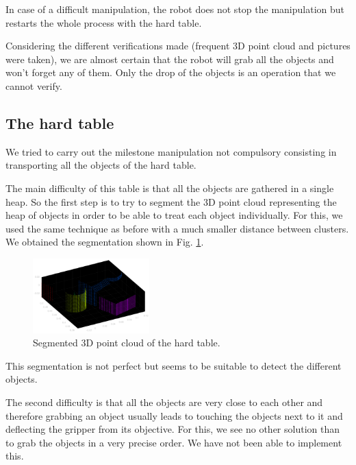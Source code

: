 \documentclass[a4paper, 10pt, conference]{ieeeconf}
\begin{document}
    In case of a difficult manipulation, the robot does not stop the manipulation but restarts the whole process with the hard table.
    
    Considering the different verifications made (frequent 3D point cloud and pictures were taken), we are almost certain that the robot will grab all the objects and won't forget any of them. Only the drop of the objects is an operation that we cannot verify.
    
    \subsection{The hard table}
    
    We tried to carry out the milestone manipulation not compulsory consisting in transporting all the objects of the hard table.
    
    The main difficulty of this table is that all the objects are gathered in a single heap. So the first step is to try to segment the 3D point cloud representing the heap of objects in order to be able to treat each object individually. For this, we used the same technique as before with a much smaller distance between clusters. We obtained the segmentation shown in Fig. \ref{fig:manipulation.hard.table}.
    
    \begin{figure}[!h]
        \centering
        \includegraphics[width=0.4\textwidth]{resources/png/clusters-hard-segmented.png}
        \caption{Segmented 3D point cloud of the hard table.}
        \label{fig:manipulation.hard.table}
    \end{figure}
    
    This segmentation is not perfect but seems to be suitable to detect the different objects.
    
    The second difficulty is that all the objects are very close to each other and therefore grabbing an object usually leads to touching the objects next to it and deflecting the gripper from its objective. For this, we see no other solution than to grab the objects in a very precise order. We have not been able to implement this.
    
\end{document}
